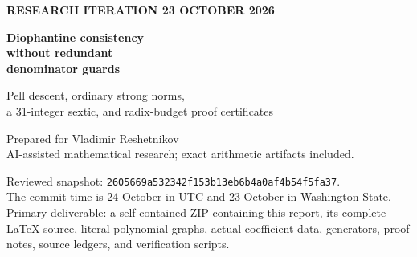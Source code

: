 \documentclass[11pt]{article}
\theoremstyle{definition}
\theoremstyle{remark}
\newcommand{\pin}{\texttt{2605669a532342f153b13eb6b4a0af4b54f5fa37}}
\begin{document}
\thispagestyle{empty}
{\color{accent}\sffamily\bfseries RESEARCH ITERATION \hfill 23 OCTOBER 2026}
\vspace{1.0cm}
{\color{navy}\Huge\bfseries Diophantine consistency\\[4pt] without redundant\\[4pt] denominator guards\par}
\vspace{0.5cm}
{\Large Pell descent, ordinary strong norms,\\a 31-integer sextic, and radix-budget proof certificates\par}
\vspace{0.5cm}
Prepared for Vladimir Reshetnikov\\
AI-assisted mathematical research; exact arithmetic artifacts included.
\vspace{0.6cm}

\begin{abstract}
We give new explicit arithmetic reductions of the repository's consistency
equations. The eleven-positive-variable construction drops from degree 325
and 113 arithmetic operations to degree \textbf{277} and \textbf{111}
operations. A more substantial rearrangement of the proof yields a
twelve-positive-variable equation of degree \textbf{70} in \textbf{100}
operations, improving the previous degree-82 construction. A compatible
composition of two recent signed-domain arguments yields a sextic in
\textbf{31 unrestricted integers}, improving the 32-integer sextic.
A separate nine-positive-variable construction lowers degree to
\textbf{1,158,240}, at the cost of 811 operations.

The most different research direction is a direct proof-certificate
encoding: a descending coefficient budget replaces an entire coprimality
block by uniqueness of positional notation. Its finite-certificate theorem
is proved, but its final ordinary Diophantine compiler output has not been
materialized or counted. It is not included among the completed polynomial
size records.

The completed equations use exactly specified fixed coefficients and compose
with the named ordinary native-encoding and refutation-calibration proofs
already in ProveIt. We supply full proofs of the new reductions and precise
source boundaries. We do not claim global minimality, a world-first result,
a proof of consistency, or a new end-to-end Lean/Rocq derivation.
\end{abstract}

\vfill
\small
Reviewed snapshot: \pin.\\
The commit time is 24 October in UTC and 23 October in Washington State.\\
Primary deliverable: a self-contained ZIP containing this report, its complete
LaTeX source, literal polynomial graphs, actual coefficient data, generators,
proof notes, source ledgers, and verification scripts.
\newpage
\tableofcontents
\newpage
\end{document}
